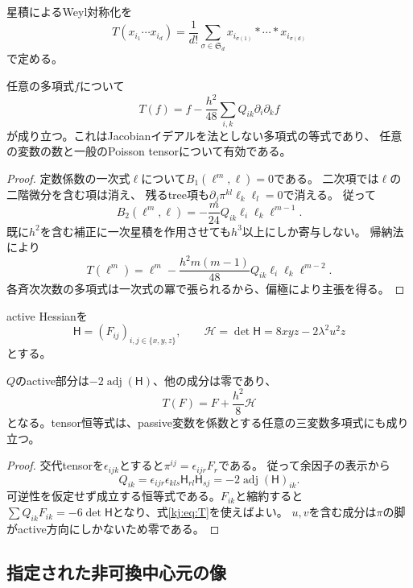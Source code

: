 星積によるWeyl対称化を
\[
 T(x_{i_1}\cdots x_{i_d})
 =\frac1{d!}\sum_{\sigma\in\mathfrak S_d}
 x_{i_{\sigma(1)}}*\cdots*x_{i_{\sigma(d)}}
\]
で定める。
\begin{lemma}[対称化写像の二次項]\label{kj:lem:symmetrization}
任意の多項式$f$について
\begin{equation}\label{kj:eq:T}
 T(f)=f-\frac{h^2}{48}\sum_{i,k}Q_{ik}\partial_i\partial_kf
\end{equation}
が成り立つ。これはJacobianイデアルを法としない多項式の等式であり、
任意の変数の数と一般のPoisson tensorについて有効である。
\end{lemma}
\begin{proof}
定数係数の一次式$\ell$について$B_1(\ell^m,\ell)=0$である。
二次項では$\ell$の二階微分を含む項は消え、
残るtree項も$\partial_j\pi^{kl}\ell_k\ell_l=0$で消える。
従って
\[
 B_2(\ell^m,\ell)=-\frac m{24}Q_{ik}\ell_i\ell_k\ell^{m-1}.
\]
既に$h^2$を含む補正に一次星積を作用させても$h^3$以上にしか寄与しない。
帰納法により
\[
 T(\ell^m)=\ell^m-\frac{h^2m(m-1)}{48}
 Q_{ik}\ell_i\ell_k\ell^{m-2}.
\]
各斉次次数の多項式は一次式の冪で張られるから、偏極により主張を得る。
\end{proof}

active Hessianを
\begin{equation}\label{kj:eq:hessian}
 \mathsf H=(F_{ij})_{i,j\in\{x,y,z\}},\qquad
 \mathcal H=\det\mathsf H=8xyz-2\lambda^2u^2z
\end{equation}
とする。
\begin{lemma}\label{kj:lem:hessian}
$Q$のactive部分は$-2\operatorname{adj}(\mathsf H)$、他の成分は零であり、
\begin{equation}\label{kj:eq:T-F}
 T(F)=F+\frac{h^2}{8}\mathcal H
\end{equation}
となる。tensor恒等式は、passive変数を係数とする任意の三変数多項式にも成り立つ。
\end{lemma}
\begin{proof}
交代tensorを$\epsilon_{ijk}$とすると$\pi^{ij}=\epsilon_{ijr}F_r$である。
従って余因子の表示から
\[
 Q_{ik}=\epsilon_{ijr}\epsilon_{kls}\mathsf H_{rl}\mathsf H_{sj}
       =-2\operatorname{adj}(\mathsf H)_{ik}.
\]
可逆性を仮定せず成立する恒等式である。$F_{ik}$と縮約すると
$\sum Q_{ik}F_{ik}=-6\det\mathsf H$となり、式\eqref{kj:eq:T}を使えばよい。
$u,v$を含む成分は$\pi$の脚がactive方向にしかないため零である。
\end{proof}

\subsection{指定された非可換中心元の像}

